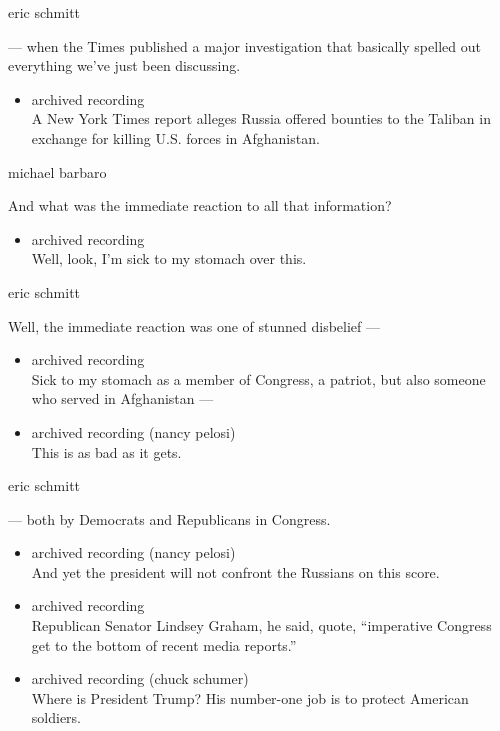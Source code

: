 eric schmitt

--- when the Times published a major investigation that basically
spelled out everything we've just been discussing.

\begin{itemize}
\tightlist
\item
  archived recording\\
  A New York Times report alleges Russia offered bounties to the Taliban
  in exchange for killing U.S. forces in Afghanistan.
\end{itemize}

michael barbaro

And what was the immediate reaction to all that information?

\begin{itemize}
\tightlist
\item
  archived recording\\
  Well, look, I'm sick to my stomach over this.
\end{itemize}

eric schmitt

Well, the immediate reaction was one of stunned disbelief ---

\begin{itemize}
\item
  archived recording\\
  Sick to my stomach as a member of Congress, a patriot, but also
  someone who served in Afghanistan ---
\item
  archived recording (nancy pelosi)\\
  This is as bad as it gets.
\end{itemize}

eric schmitt

--- both by Democrats and Republicans in Congress.

\begin{itemize}
\item
  archived recording (nancy pelosi)\\
  And yet the president will not confront the Russians on this score.
\item
  archived recording\\
  Republican Senator Lindsey Graham, he said, quote, ``imperative
  Congress get to the bottom of recent media reports.''
\item
  archived recording (chuck schumer)\\
  Where is President Trump? His number-one job is to protect American
  soldiers.
\end{itemize}

